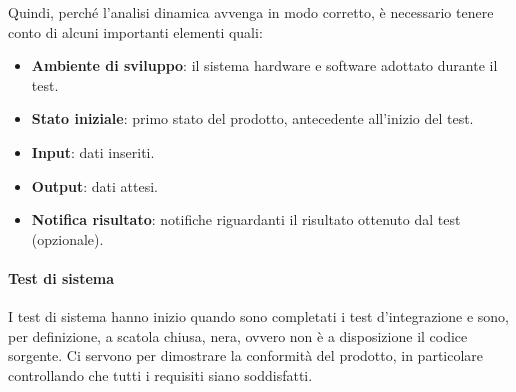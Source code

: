 		Quindi, perché l'analisi dinamica avvenga in modo corretto, è necessario tenere conto di alcuni importanti elementi quali:
		\begin{itemize}
			\item \textbf{Ambiente di sviluppo}: il sistema hardware e software adottato durante il test.
			\item \textbf{Stato iniziale}: primo stato del prodotto, antecedente all'inizio del test.
			\item \textbf{Input}: dati inseriti.
			\item \textbf{Output}: dati attesi.
			\item \textbf{Notifica risultato}: notifiche riguardanti il risultato ottenuto dal test (opzionale).
		\end{itemize}
		
			
			
			\paragraph{Test di sistema} \label{testsistema} 
			I test di sistema hanno inizio quando sono completati i test d'integrazione e sono, per definizione, a scatola chiusa, nera, ovvero non è a disposizione il codice sorgente.
			Ci servono per dimostrare la conformità del prodotto, in particolare controllando che tutti i requisiti siano soddisfatti.
			
